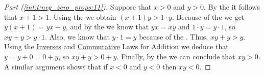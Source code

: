 \begin{proof}[Part (\ref{int:t:neg_zero_props:11})]
	Suppose that $x > 0$ and $y > 0$. By the  it follows that $x + 1 > 1$. Using the  we obtain $(x + 1)y > 1 \cdot y$. Because of the  we get $y(x + 1) = yx + y$, and by the  we know that $y x = x y$ and $1 \cdot y = y \cdot 1$, so $x y + y > y \cdot 1$. Also, we know that $y \cdot 1 = y$ because of the . Thus, $x y + y > y$. Using the \hyperref[int:t:props:inverses_add]{Inverses} and \hyperref[int:t:props:commutative_add]{Commutative} Laws for Addition we deduce that $y = y + 0 = 0 + y$, so $x y + y > 0 + y$. Finally, by the  we can conclude that $x y > 0$. A similar argument shows that if $x < 0$ and $y < 0$ then $x y < 0$.
\end{proof}
